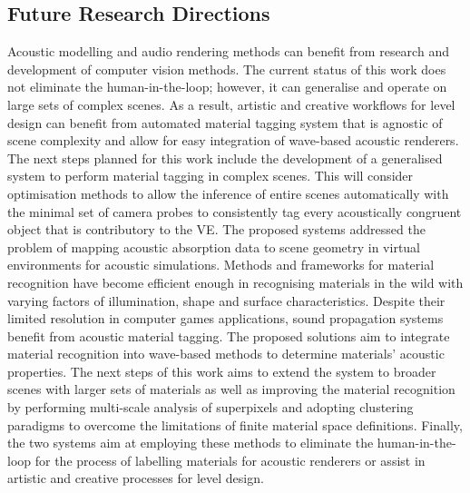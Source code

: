 \subsection{Future Research Directions}
Acoustic modelling and audio rendering methods can benefit from research and development of computer vision methods. 
The current status of this work does not eliminate the human-in-the-loop; however, it can generalise and operate on large sets of complex scenes. As a result, artistic and creative workflows for level design can benefit from automated material tagging system that is agnostic of scene complexity and allow for easy integration of wave-based acoustic renderers.
The next steps planned for this work include the development of a generalised system to perform material tagging in complex scenes. This will consider optimisation methods to allow the inference of entire scenes automatically with the minimal set of camera probes to consistently tag every acoustically congruent object that is contributory to the VE. 
The proposed systems addressed the problem of mapping acoustic absorption data to scene geometry in virtual environments for acoustic simulations. Methods and frameworks for material recognition have become efficient enough in recognising materials in the wild with varying factors of illumination, shape and surface characteristics. Despite their limited resolution in computer games applications, sound propagation systems benefit from acoustic material tagging. The proposed solutions aim to integrate material recognition into wave-based methods to determine materials' acoustic properties.
The next steps of this work aims to extend the system to broader scenes with larger sets of materials as well as improving the material recognition by performing multi-scale analysis of superpixels and adopting clustering paradigms to overcome the limitations of finite material space definitions.
Finally, the two systems aim at employing these methods to eliminate the human-in-the-loop for the process of labelling materials for acoustic renderers or assist in artistic and creative processes for level design. 

